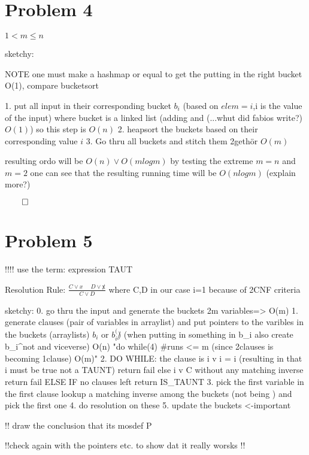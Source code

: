 \documentclass[a4paper,twoside=false,abstract=false,numbers=noenddot,
titlepage=false,headings=small,parskip=half,version=last]{scrartcl}
\begin{document}
\section{Problem 4}


$1 < m \leq n$

sketchy:

NOTE one must make a hashmap or equal to get the putting in the right bucket O(1), compare bucketsort

1. put all input in their corresponding bucket $b_i$ (based on $elem=i$,i is the value of the input) where bucket is a linked list (adding and (...whut did fabios write?) $O(1)$) so this step is $O(n)$
2. heapsort the buckets based on their corresponding value $i$
3. Go thru all buckets and stitch them 2gethör $O(m)$

resulting ordo will be $ O(n) \vee O(mlogm)$ by testing the extreme $m=n$ and $m=2$ one can see that the resulting running time will be $O(nlogm)$ (explain more?)

$\qed$
\section{Problem 5}

!!!! use the term: expression \notin TAUT

Resolution Rule: $\frac{C \vee x \ \ \ \ \ \ D \vee \not x}{C \vee D}$ where C,D \in {} in our case i=1 because of 2CNF criteria 

sketchy:
0. go thru the input and generate the buckets 2m variables=> O(m)
1. generate clauses (pair of variables in arraylist) and put pointers to the varibles in the buckets (arraylists) $b_i$ or $b_i^(\not)$ (when putting in something in b_i also create b_i^not and viceverse)         O(n)
   "do while(4) #runs <= m  (since 2clauses is becoming 1clause) O(m)" 
2. DO WHILE: the clause is i v i = i (resulting in that i must be true not a TAUNT) return fail else i v C without any matching inverse return fail ELSE IF no clauses left return IS_TAUNT
    3. pick the first variable in the first clause lookup a matching inverse among the buckets (not being ) and pick the first one
    4. do resolution on these
    5. update the buckets <-important

!! draw the conclusion that its mosdef \in P

!!check again with the pointers etc. to show dat it really worsks !!
\end{document}
